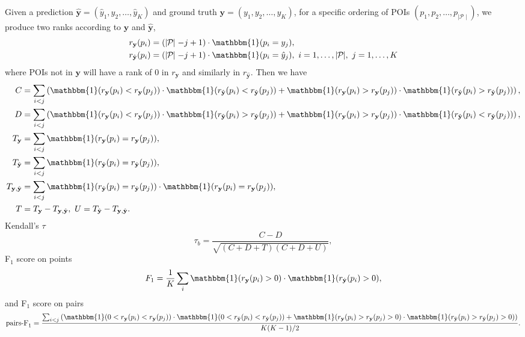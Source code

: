 Given a prediction $\hat{\mathbf{y}} = (\hat{y}_1, \hat{y}_2, \dots, \hat{y}_K)$ and ground truth $\mathbf{y} = (y_1, y_2, \dots, y_K)$,
for a specific ordering of POIs $(p_1, p_2, \dots, p_{\mid\mathcal{P}\mid})$,
we produce two ranks according to $\mathbf{y}$ and $\hat{\mathbf{y}}$,
\begin{align*}
r_{\mathbf{y}}(p_i)       &= (\mid\!\! \mathcal{P} \!\!\mid - j + 1) \cdot \mathbbm{1}(p_i = y_j), \\
r_{\hat{\mathbf{y}}}(p_i) &= (\mid\!\! \mathcal{P} \!\!\mid - j + 1) \cdot \mathbbm{1}(p_i = \hat{y}_j),~ 
i = 1, \dots, \mid\!\! \mathcal{P} \!\!\mid,~ j = 1, \dots, K
\end{align*}
where POIs not in $\mathbf{y}$ will have a rank of $0$ in $r_{\mathbf{y}}$ and similarly in $r_{\hat{\mathbf{y}}}$.
Then we have
\begin{align*}
C &= \sum_{i < j} \left(\mathbbm{1}(r_{\mathbf{y}}(p_i) < r_{\mathbf{y}}(p_j)) \cdot \mathbbm{1}(r_{\hat{\mathbf{y}}}(p_i) < r_{\hat{\mathbf{y}}}(p_j)) +
     \mathbbm{1}(r_{\mathbf{y}}(p_i) > r_{\mathbf{y}}(p_j)) \cdot \mathbbm{1}(r_{\hat{\mathbf{y}}}(p_i) > r_{\hat{\mathbf{y}}}(p_j)) \right), \\
D &= \sum_{i < j} \left(\mathbbm{1}(r_{\mathbf{y}}(p_i) < r_{\mathbf{y}}(p_j)) \cdot \mathbbm{1}(r_{\hat{\mathbf{y}}}(p_i) > r_{\hat{\mathbf{y}}}(p_j)) +
     \mathbbm{1}(r_{\mathbf{y}}(p_i) > r_{\mathbf{y}}(p_j)) \cdot \mathbbm{1}(r_{\hat{\mathbf{y}}}(p_i) < r_{\hat{\mathbf{y}}}(p_j)) \right), \\
T_{\mathbf{y}}       &= \sum_{i < j} \mathbbm{1}(r_{\mathbf{y}}(p_i) = r_{\mathbf{y}}(p_j)), \\
T_{\hat{\mathbf{y}}} &= \sum_{i < j} \mathbbm{1}(r_{\hat{\mathbf{y}}}(p_i) = r_{\hat{\mathbf{y}}}(p_j)), \\
T_{\mathbf{y},\hat{\mathbf{y}}} &= \sum_{i < j} \mathbbm{1}(r_{\hat{\mathbf{y}}}(p_i) = r_{\hat{\mathbf{y}}}(p_j)) \cdot
                                   \mathbbm{1}(r_{\mathbf{y}}(p_i) = r_{\mathbf{y}}(p_j)), \\
T &= T_{\mathbf{y}} - T_{\mathbf{y},\hat{\mathbf{y}}},~ U = T_{\hat{\mathbf{y}}} - T_{\mathbf{y},\hat{\mathbf{y}}}.
\end{align*}
\noindent
Kendall's $\tau$
\begin{equation*}
\tau_b = \frac{C - D}{\sqrt{(C + D + T) (C + D + U)}},
\end{equation*}
F$_1$ score on points 
\begin{equation*}
F_1 = \frac{1}{K} \sum_i \mathbbm{1}(r_{\mathbf{y}}(p_i) > 0) \cdot \mathbbm{1}(r_{\hat{\mathbf{y}}}(p_i) > 0),
\end{equation*}
and F$_1$ score on pairs
\begin{equation*}
\text{pairs-F}_1 = \frac{\sum_{i < j} \left(\mathbbm{1}(0 < r_{\mathbf{y}}(p_i) < r_{\mathbf{y}}(p_j)) \cdot 
                                            \mathbbm{1}(0 < r_{\hat{\mathbf{y}}}(p_i) < r_{\hat{\mathbf{y}}}(p_j)) +
                                            \mathbbm{1}(r_{\mathbf{y}}(p_i) > r_{\mathbf{y}}(p_j) > 0) \cdot 
                                            \mathbbm{1}(r_{\hat{\mathbf{y}}}(p_i) > r_{\hat{\mathbf{y}}}(p_j) > 0) \right)}{K(K-1)/2}.
\end{equation*}
